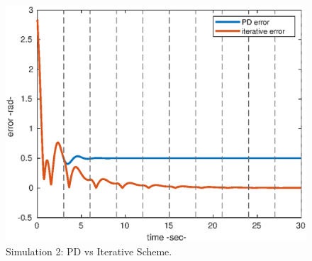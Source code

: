 \begin{center}
\begin{figure}[!h]
\hspace{-0.25cm}\centerline{\includegraphics[scale=0.65]{figures/2_1_PDcomp.eps}}
\caption{\label{2_1pdvit}
Simulation 2: PD vs Iterative Scheme.}
\end{figure}
\end{center}


